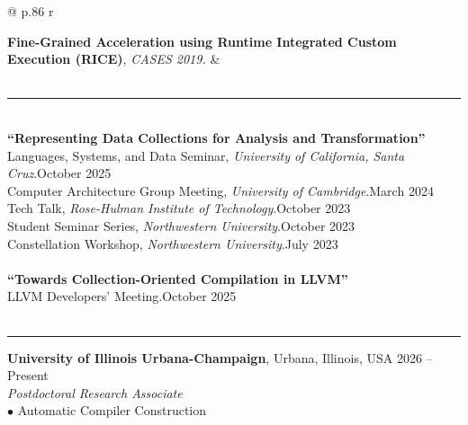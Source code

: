 \documentclass{article}
\begin{document}
\begin{tabular*}{\textwidth}{@{\noindent} p{} r}
    
      \vspace{0em}
      
    
  {\bf Fine-Grained Acceleration using Runtime Integrated Custom Execution (RICE)}, {\em CASES 2019.} & 
   \\
 \\


\end{tabular*}
  
\vspace{1em}
\hrule
\vspace{0.5em}

\vspace{0.5em}
\\{\bf ``Representing Data Collections for Analysis and Transformation''} \\Languages, Systems, and Data Seminar, {\em University of California, Santa Cruz}.\hfill October 2025 \\Computer Architecture Group Meeting, {\em University of Cambridge}.\hfill March 2024 \\Tech Talk, {\em Rose-Hulman Institute of Technology}.\hfill October 2023 \\Student Seminar Series, {\em Northwestern University}.\hfill October 2023 \\Constellation Workshop, {\em Northwestern University}.\hfill July 2023 \\\\{\bf ``Towards Collection-Oriented Compilation in LLVM''} \\LLVM Developers' Meeting.\hfill October  2025 \\\\\vspace{-1em}
\hrule
\vspace{0.5em}

\vspace{0.5em}


\textbf{University of Illinois Urbana-Champaign}, Urbana, Illinois, USA \hfill 2026 -- Present \\
{\em Postdoctoral Research Associate }   \\$\bullet$ Automatic Compiler Construction \\\vspace{0.5em}    
\end{document}
